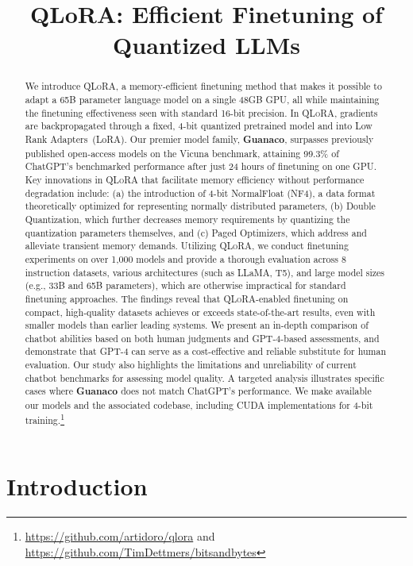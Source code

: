 \title{QLoRA: Efficient Finetuning of Quantized LLMs}

\begin{abstract}
We introduce \textsc{QLoRA}, a memory-efficient finetuning method that makes it possible to adapt a 65B parameter language model on a single 48GB GPU, all while maintaining the finetuning effectiveness seen with standard 16-bit precision. In \textsc{QLoRA}, gradients are backpropagated through a fixed, 4-bit quantized pretrained model and into Low Rank Adapters~(LoRA). Our premier model family, \textbf{Guanaco}, surpasses previously published open-access models on the Vicuna benchmark, attaining 99.3\% of ChatGPT’s benchmarked performance after just 24 hours of finetuning on one GPU. Key innovations in \textsc{QLoRA} that facilitate memory efficiency without performance degradation include: (a) the introduction of 4-bit NormalFloat (NF4), a data format theoretically optimized for representing normally distributed parameters, (b) Double Quantization, which further decreases memory requirements by quantizing the quantization parameters themselves, and (c) Paged Optimizers, which address and alleviate transient memory demands. Utilizing \textsc{QLoRA}, we conduct finetuning experiments on over 1,000 models and provide a thorough evaluation across 8 instruction datasets, various architectures (such as LLaMA, T5), and large model sizes (e.g., 33B and 65B parameters), which are otherwise impractical for standard finetuning approaches. The findings reveal that \textsc{QLoRA}-enabled finetuning on compact, high-quality datasets achieves or exceeds state-of-the-art results, even with smaller models than earlier leading systems. We present an in-depth comparison of chatbot abilities based on both human judgments and GPT-4-based assessments, and demonstrate that GPT-4 can serve as a cost-effective and reliable substitute for human evaluation. Our study also highlights the limitations and unreliability of current chatbot benchmarks for assessing model quality. A targeted analysis illustrates specific cases where \textbf{Guanaco} does not match ChatGPT's performance. We make available our models and the associated codebase, including CUDA implementations for 4-bit training.\footnote{\url{https://github.com/artidoro/qlora} and \url{https://github.com/TimDettmers/bitsandbytes}}
\end{abstract}

\section{Introduction}

